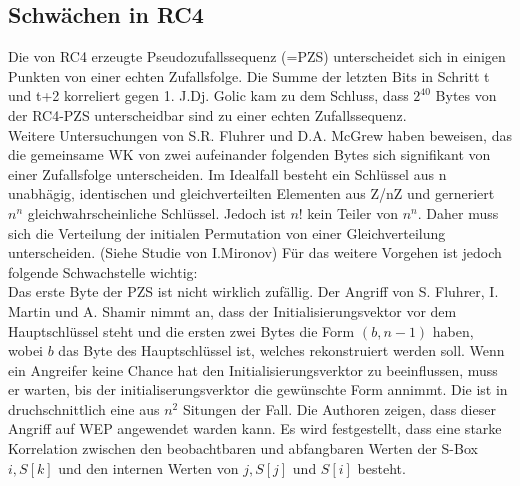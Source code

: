 \documentclass[10pt,a4paper]{article}
\begin{document}
\subsection{Schwächen in RC4}
Die von RC4 erzeugte Pseudozufallssequenz (=PZS) unterscheidet sich in einigen Punkten von einer echten Zufallsfolge. Die Summe der letzten Bits in Schritt t und t+2 korreliert gegen 1.
J.Dj. Golic kam zu dem Schluss, dass ${2}^{40}$ Bytes von der RC4-PZS unterscheidbar sind zu einer echten Zufallssequenz.\\
Weitere Untersuchungen von S.R. Fluhrer und D.A. McGrew haben beweisen, das die gemeinsame WK von zwei aufeinander folgenden Bytes sich signifikant von einer Zufallsfolge unterscheiden. Im Idealfall besteht ein Schlüssel aus n unabhägig, identischen und gleichverteilten Elementen aus Z/nZ und gerneriert $n^n$ gleichwahrscheinliche Schlüssel. Jedoch ist $n!$ kein Teiler von $n^n$. Daher muss sich die Verteilung der initialen Permutation von einer Gleichverteilung unterscheiden. (Siehe Studie von I.Mironov)
Für das weitere Vorgehen ist jedoch folgende Schwachstelle wichtig:\\
Das erste Byte der PZS ist nicht wirklich zufällig. Der Angriff von S. Fluhrer, I. Martin und A. Shamir nimmt an, dass der Initialisierungsvektor vor dem Hauptschlüssel steht und die ersten zwei Bytes die Form $(b,n-1)$ haben, wobei $b$ das Byte des Hauptschlüssel ist, welches rekonstruiert werden soll. Wenn ein Angreifer keine Chance hat den Initialisierungsverktor zu beeinflussen, muss er warten, bis der initialiserungsverktor die gewünschte Form annimmt. Die ist in druchschnittlich eine aus $n^2$ Situngen der Fall. Die Authoren zeigen, dass dieser Angriff auf WEP angewendet warden kann.
Es wird festgestellt, dass eine starke Korrelation zwischen den beobachtbaren und abfangbaren Werten der S-Box $i, S[k]$ und den internen Werten von $j, S[j]$ und $S[i]$ besteht.
\end{document}
